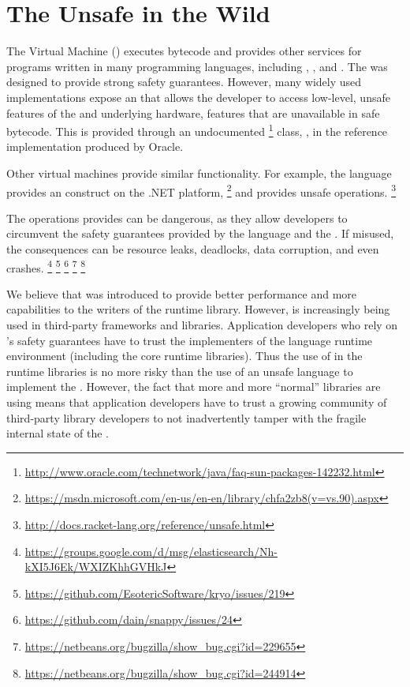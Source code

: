

\chapter{The \java{} Unsafe \api{} in the Wild}\label{cha:unsafe}

The \java{} Virtual Machine (\jvm{}) executes \java{} bytecode and
provides other services for programs written in
many programming languages, including \java{}, \scala{}, and \clojure{}.
The \jvm{} was designed to provide strong safety guarantees.
However, many widely used \jvm{} implementations expose an \api{} that
allows the developer to access low-level,
unsafe features of the \jvm{} and underlying hardware,
features that are unavailable in safe \java{} bytecode.
This \api{} is provided through an undocumented%
\footnote{\url{http://www.oracle.com/technetwork/java/faq-sun-packages-142232.html}}
class, \smu{}, in the \java{} reference implementation produced by Oracle.

Other virtual machines provide similar functionality.
For example, the \csharp{} language provides an  construct
on the .NET platform,%
\footnote{\url{https://msdn.microsoft.com/en-us/en-en/library/chfa2zb8(v=vs.90).aspx}}
and \racket{} provides unsafe operations.%
\footnote{\url{http://docs.racket-lang.org/reference/unsafe.html}}

The operations \smu{} provides can be dangerous,
as they allow developers to circumvent the safety guarantees provided by
the \java{} language and the \jvm{}.
If misused, the consequences can be resource leaks, deadlocks,
data corruption, and even \jvm{} crashes.%
\footnote{\url{https://groups.google.com/d/msg/elasticsearch/Nh-kXI5J6Ek/WXIZKhhGVHkJ}}
\footnote{\url{https://github.com/EsotericSoftware/kryo/issues/219}}
\footnote{\url{https://github.com/dain/snappy/issues/24}}
\footnote{\url{https://netbeans.org/bugzilla/show_bug.cgi?id=229655}}
\footnote{\url{https://netbeans.org/bugzilla/show_bug.cgi?id=244914}}

We believe that \smu{} was introduced to provide better performance and
more capabilities to the writers of the \java{} runtime library.
However, \smu{} is increasingly being used in third-party
frameworks and libraries.
Application developers who rely on \java{}'s safety guarantees have to
trust the implementers of the language runtime environment
(including the core runtime libraries).
Thus the use of \smu{} in the runtime libraries is no more risky than
the use of an unsafe language to implement the \jvm{}.
However, the fact that more and more ``normal'' libraries are using
\smu{} means that application developers have to trust a growing
community of third-party \java{} library developers to not
inadvertently tamper with the fragile internal state of the \jvm{}.

